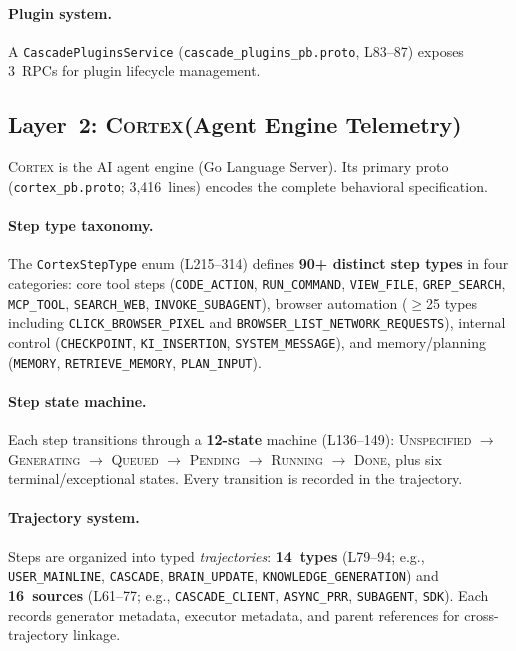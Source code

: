 \documentclass[sigconf,anonymous]{acmart}
\newcommand{\cortex}{\textsc{Cortex}\xspace}
\begin{document}
\paragraph{Plugin system.}
A \texttt{CascadePluginsService}
(\texttt{cascade\_plugins\_pb.proto}, L83--87) exposes 3~RPCs for
plugin lifecycle management.


\subsection{Layer~2: \cortex (Agent Engine Telemetry)}\label{sec:cortex}

\cortex is the AI agent engine (Go Language Server).  Its primary
proto (\texttt{cortex\_pb.proto}; 3,416~lines) encodes the complete
behavioral specification.

\paragraph{Step type taxonomy.}
The \texttt{CortexStepType} enum (L215--314) defines \textbf{90+
distinct step types} in four categories: core tool steps
(\texttt{CODE\_ACTION}, \texttt{RUN\_COMMAND}, \texttt{VIEW\_FILE},
\texttt{GREP\_SEARCH}, \texttt{MCP\_TOOL}, \texttt{SEARCH\_WEB},
\texttt{INVOKE\_SUBAGENT}), browser automation ($\geq$25 types
including \texttt{CLICK\_BROWSER\_PIXEL} and
\texttt{BROWSER\_LIST\_NETWORK\_REQUESTS}), internal control
(\texttt{CHECKPOINT}, \texttt{KI\_INSERTION},
\texttt{SYSTEM\_MESSAGE}), and memory/planning
(\texttt{MEMORY}, \texttt{RETRIEVE\_MEMORY},
\texttt{PLAN\_INPUT}).

\paragraph{Step state machine.}
Each step transitions through a \textbf{12-state} machine
(L136--149): \textsc{Unspecified} $\to$ \textsc{Generating} $\to$
\textsc{Queued} $\to$ \textsc{Pending} $\to$ \textsc{Running} $\to$
\textsc{Done}, plus six terminal/exceptional states.  Every
transition is recorded in the trajectory.

\paragraph{Trajectory system.}
Steps are organized into typed \emph{trajectories}: \textbf{14~types}
(L79--94; e.g., \texttt{USER\_MAINLINE}, \texttt{CASCADE},
\texttt{BRAIN\_UPDATE}, \texttt{KNOWLEDGE\_GENERATION}) and
\textbf{16~sources} (L61--77; e.g., \texttt{CASCADE\_CLIENT},
\texttt{ASYNC\_PRR}, \texttt{SUBAGENT}, \texttt{SDK}).  Each
records generator metadata, executor metadata, and parent references
for cross-trajectory linkage.
\end{document}
